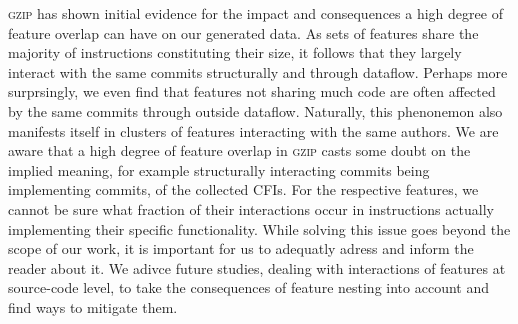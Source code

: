 \textsc{gzip} has shown initial evidence for the impact and consequences a high degree of feature overlap can have on our generated data.
As sets of features share the majority of instructions constituting their size, it follows that they largely interact with the same commits structurally and through dataflow.
Perhaps more surprsingly, we even find that features not sharing much code are often affected by the same commits through outside dataflow. %
Naturally, this phenonemon also manifests itself in clusters of features interacting with the same authors.
We are aware that a high degree of feature overlap in \textsc{gzip} casts some doubt on the implied meaning, for example structurally interacting commits being implementing commits, of the collected CFIs.
For the respective features, we cannot be sure what fraction of their interactions occur in instructions actually implementing their specific functionality.
While solving this issue goes beyond the scope of our work, it is important for us to adequatly adress and inform the reader about it.
We adivce future studies, dealing with interactions of features at source-code level, to take the consequences of feature nesting into account and find ways to mitigate them.

